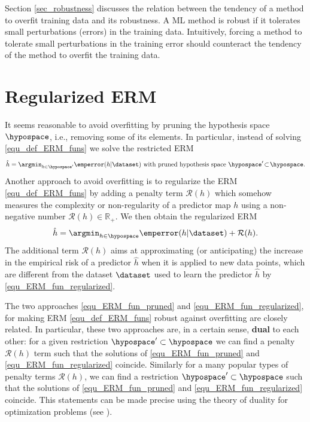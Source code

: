 \documentclass[12pt]{report}
\begin{document}
Section \ref{sec_robustness} discusses the relation between 
the tendency of a method to overfit training data and its robustness. 
A ML method is robust if it tolerates small perturbations (errors) 
in the training data. Intuitively, forcing a method to tolerate small 
perturbations in the training error should counteract the tendency 
of the method to overfit the training data. 

\section{Regularized ERM} 
It seems reasonable to avoid overfitting by pruning the 
hypothesis space $\hypospace$, i.e., removing some of 
its elements. In particular, instead of solving \eqref{equ_def_ERM_funs} 
we solve the restricted ERM 
\begin{equation}
\label{equ_ERM_fun_pruned}
   \hat{h} = \argmin_{h \in \hypospace'} \emperror(h|\dataset) \mbox{ with pruned hypothesis space } \hypospace' \!\subset\!\hypospace. 
\end{equation}
Another approach to avoid overfitting is to regularize the ERM \eqref{equ_def_ERM_funs} 
by adding a penalty term $\mathcal{R}(h)$ which somehow measures the complexity or 
non-regularity of a predictor map $h$ using a non-negative number $\mathcal{R}(h) \in \mathbb{R}_{+}$. 
We then obtain the regularized ERM 
\begin{equation}
\label{equ_ERM_fun_regularized}
  \hat{h} = \argmin_{h \in \hypospace} \emperror(h|\dataset)  + \mathcal{R}(h). 
\end{equation} 
The additional term $\mathcal{R}(h)$ aims at approximating (or anticipating) the 
increase in the empirical risk of a predictor $\hat{h}$ when it is applied to new 
data points, which are different from the dataset $\dataset$ used to learn the 
predictor $\hat{h}$ by \eqref{equ_ERM_fun_regularized}. 

The two approaches \eqref{equ_ERM_fun_pruned} and \eqref{equ_ERM_fun_regularized}, for 
making ERM \eqref{equ_def_ERM_funs} robust against overfitting are closely related. In particular, 
these two approaches are, in a certain sense, {\bf dual} to each other: for a given restriction 
$\hypospace' \subset \hypospace$ we can find a penalty $\mathcal{R}(h)$ term such that the 
solutions of \eqref{equ_ERM_fun_pruned} and \eqref{equ_ERM_fun_regularized} coincide. Similarly 
for a many popular types of penalty terms $\mathcal{R}(h)$, we can find a restriction $\hypospace' \subset \hypospace$ 
such that the solutions of \eqref{equ_ERM_fun_pruned} and \eqref{equ_ERM_fun_regularized} coincide. 
This statements can be made precise using the theory of duality for optimization problems (see \cite{BertsekasNonLinProgr}). 
\end{document}
